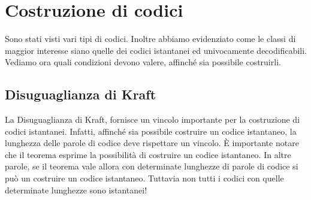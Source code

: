 \newpage

\section{Costruzione di codici}
Sono stati visti vari tipi di codici. Inoltre abbiamo evidenziato come le classi di maggior interesse siano quelle dei codici istantanei 
ed univocamente decodificabili. Vediamo ora quali condizioni devono valere, affinché sia possibile costruirli.

\subsection{Disuguaglianza di Kraft}
La Disuguaglianza di Kraft, fornisce un vincolo importante per la costruzione di codici istantanei.
Infatti, affinché sia possibile costruire un codice istantaneo, la lunghezza delle parole di codice deve rispettare un vincolo.
\`E importante notare che il teorema esprime la possibilità di costruire un codice istantaneo. In altre parole, se il teorema vale allora con determinate lunghezze di parole di codice si può un costruire un codice istantaneo. Tuttavia non tutti i codici con quelle determinate lunghezze sono istantanei!


